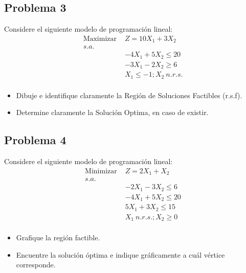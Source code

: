 \documentclass[letterpaper]{article}
\begin{document}
\subsection*{Problema 3}
Considere el siguiente modelo de programación lineal:
\begin{align*}
\mbox{Maximizar }&Z = 10X_1 + 3X_2\\
s.a.\\
&-4X_1 + 5X_2 \leq 20\\
&-3X_1 - 2X_2 \geq 6\\
&X_1 \leq -1 ; X_2\: n.r.s.\\
\end{align*}
\begin{itemize}
\item Dibuje e identifique claramente la Región de Soluciones Factibles (r.s.f).
\item Determine claramente la Solución Optima, en caso de existir.
\end{itemize}


\subsection*{Problema 4}
Considere el siguiente modelo de programación lineal:
\begin{align*}
\mbox{Minimizar }&Z = 2X_1 + X_2\\
s.a.\\
&-2X_1 - 3X_2 \leq 6\\
&-4X_1 + 5X_2 \leq 20\\
&5X_1 + 3X_2 \leq 15\\
&X_1\: n.r.s.; X_2 \geq 0 \\
\end{align*}
\begin{itemize}
\item Grafique la región factible.
\item Encuentre la solución óptima e indique gráficamente a cuál vértice corresponde.
\end{itemize}
\end{document}
